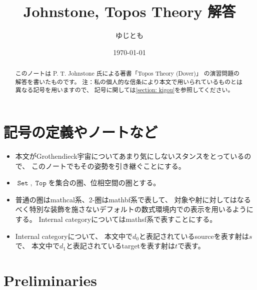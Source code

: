 \documentclass[uplatex]{jsarticle}
\theoremstyle{definition}
\DeclareMathOperator{\sfSet}{\mathtt{Set}}
\DeclareMathOperator{\sfTop}{\mathtt{Top}}
\begin{document}
\title{Johnstone, Topos Theory 解答}
\date{\today}
\author{ゆじとも}

\maketitle

\begin{abstract}
  このノートは P. T. Johnstone 氏による著書「Topos Theory (Dover)」
  の演習問題の解答を書いたものです。
  注：私の個人的な信条により本文で用いられているものとは異なる記号を用いますので、
  記号に関しては\autoref{section: kigou}を参照してください。
\end{abstract}


\tableofcontents


\newpage
\setcounter{section}{-2}
\renewcommand{\thesection}{\ensuremath{\spadesuit}}
\section{\protect\quad 記号の定義やノートなど}
\label{section: kigou}



\begin{itemize}
  \item
  本文がGrothendieck宇宙についてあまり気にしないスタンスをとっているので、
  このノートでもその姿勢を引き継ぐことにする。
  \item
  \(\sfSet, \sfTop\)を集合の圏、位相空間の圏とする。
  \item
  普通の圏はmathcal系、2-圏はmathbf系で表して、
  対象や射に対してはなるべく特別な装飾を施さないデフォルトの数式環境内での表示を用いるようにする。
  Internal categoryについてはmathsf系で表すことにする。
  \item
  Internal categoryについて、
  本文中で\(d_0\)と表記されているsourceを表す射は\(s\)で、
  本文中で\(d_1\)と表記されているtargetを表す射は\(t\)で表す。
\end{itemize}





\newpage
\renewcommand{\thesection}{Chapter \arabic{section}:}
\section{\protect\quad Preliminaries}
\label{section: 0}
\renewcommand{\thesection}{\arabic{section}}
\end{document}
